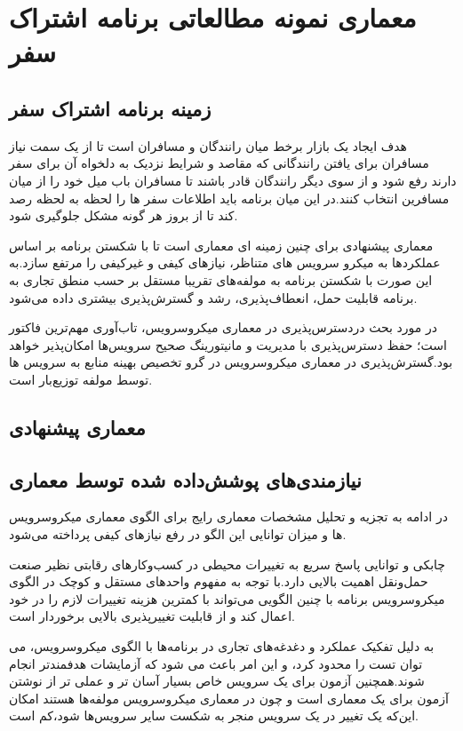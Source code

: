 \chapter{معماری نمونه مطالعاتی برنامه اشتراک سفر}

\section{زمینه برنامه اشتراک سفر}
هدف ایجاد یک بازار برخط میان رانندگان و مسافران است تا از یک سمت نیاز مسافران برای یافتن رانندگانی که مقاصد و شرایط نزدیک به دلخواه آن برای سفر دارند رفع شود و از سوی دیگر رانندگان قادر باشند تا مسافران باب میل خود را از میان مسافرین انتخاب کنند.در این میان برنامه باید اطلاعات سفر ها را لحظه به لحظه رصد کند تا از بروز هر گونه مشکل جلوگیری شود.

معماری پیشنهادی برای چنین زمینه ای معماری  است تا با شکستن برنامه بر اساس عملکرد‌ها به میکرو سرویس های متناظر، نیازهای کیفی و غیرکیفی را مرتفع سازد.به این صورت با شکستن برنامه به مولفه‌های تقریبا مستقل بر حسب منطق تجاری به برنامه قابلیت حمل، انعطاف‌پذیری، رشد و گسترش‌پذیری بیشتری داده می‌شود.

در مورد بحث دردسترس‌پذیری در معماری میکروسرویس، تاب‌‌آوری مهم‌ترین فاکتور است؛ حفظ دسترس‌پذیری با مدیریت و مانیتورینگ صحیح سرویس‌ها امکان‌پذیر خواهد بود.گسترش‌پذیری در معماری میکروسرویس در گرو تخصیص بهینه منابع به سرویس ها توسط مولفه توزیع‌بار است.

\section{معماری پیشنهادی}

\section{نیازمندی‌های پوشش‌داده شده توسط معماری}
در ادامه به تجزیه و تحلیل مشخصات معماری رایج برای الگوی معماری میکرو‌سرویس ها و میزان توانایی این الگو در رفع نیاز‌های کیفی پرداخته می‌شود.

چابکی و توانایی پاسخ سریع به تغییرات محیطی در کسب‌و‌کار‌های رقابتی نظیر صنعت حمل‌و‌نقل اهمیت بالایی دارد.با توجه به مفهوم واحدهای مستقل و کوچک در الگوی میکرو‌سرویس برنامه با چنین الگویی می‌تواند با کمترین هزینه تغییرات لازم را در خود اعمال کند و از قابلیت تغییر‌پذیری بالایی برخوردار است.

به دلیل تفکیک عملکرد و دغدغه‌های تجاری در برنامه‌ها با الگوی میکرو‌سرویس، می توان تست را محدود کرد، و این امر باعث می شود که آزمایشات هدفمندتر انجام شوند.همچنین آزمون برای یک سرویس خاص بسیار آسان تر و عملی تر از نوشتن آزمون برای یک معماری  است و چون در معماری میکروسرویس مولفه‌ها  هستند امکان این‌که یک تغییر در یک سرویس منجر به شکست سایر سرویس‌ها شود،کم است.

